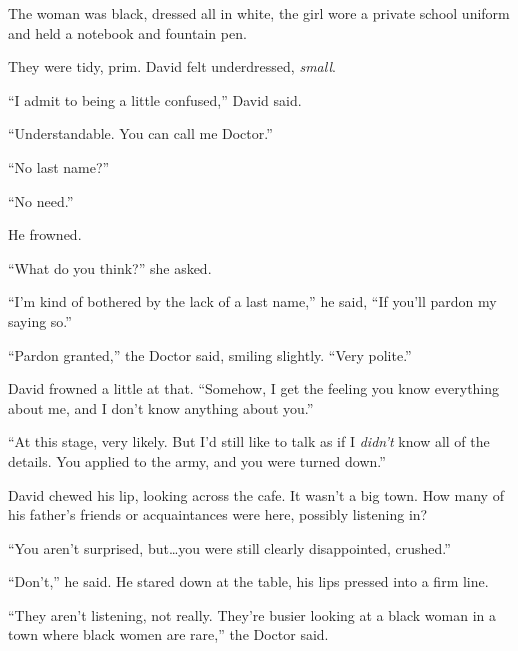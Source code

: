 The woman was black, dressed all in white, the girl wore a private school uniform and held a notebook and fountain pen.



They were tidy, prim.  David felt underdressed, \emph{small}.



``I admit to being a little confused,'' David said.



``Understandable.  You can call me Doctor.''



``No last name?''



``No need.''



He frowned.



``What do you think?'' she asked.



``I'm kind of bothered by the lack of a last name,'' he said, ``If you'll pardon my saying so.''



``Pardon granted,'' the Doctor said, smiling slightly.  ``Very polite.''



David frowned a little at that.  ``Somehow, I get the feeling you know everything about me, and I don't know anything about you.''



``At this stage, very likely.  But I'd still like to talk as if I \emph{didn't} know all of the details.  You applied to the army, and you were turned down.''



David chewed his lip, looking across the cafe.  It wasn't a big town.  How many of his father's friends or acquaintances were here, possibly listening in?



``You aren't surprised, but\ldots you were still clearly disappointed, crushed.''



``Don't,'' he said.  He stared down at the table, his lips pressed into a firm line.



``They aren't listening, not really.  They're busier looking at a black woman in a town where black women are rare,'' the Doctor said.



